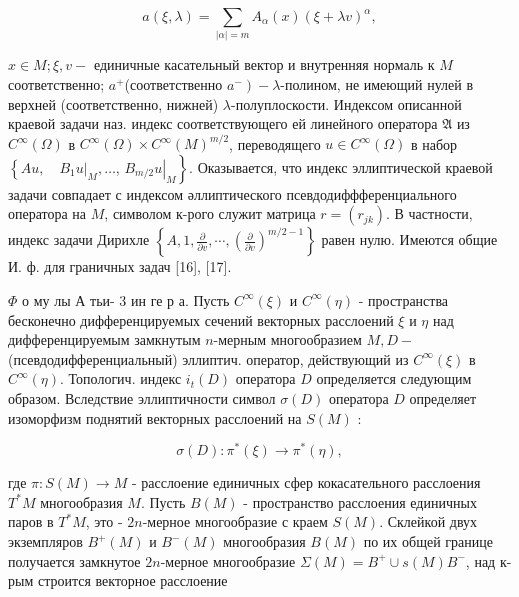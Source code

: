\documentclass[10pt]{article}
\begin{document}
\[

a(\xi, \lambda)=\sum_{|\alpha|=m} A_{\alpha}(x)(\xi+\lambda v)^{\alpha},

\]



$x \in M ; \xi, v-$ единичные касательный вектор и внутренняя нормаль к $M$ соответственно; $a^{+}$(соответственно $\left.a^{-}\right)-\lambda$-полином, не имеющий нулей в верхней (соответственно, нижней) $\lambda$-полуплоскости. Индексом описанной краевой задачи наз. индекс соответствующего ей линейного оператора $\mathfrak{A}$ из $C^{\infty}(\Omega)$ в $C^{\infty}(\Omega) \times C^{\infty}(M)^{m / 2}$, переводящего $u \in C^{\infty}(\Omega)$ в набор $\left\{A u,\left.\quad B_{1} u\right|_{M}, \ldots\right.$, $\left.\left.B_{m / 2} u\right|_{M}\right\}$. Оказывается, что индекс эллиптической краевой задачи совпадает с индексом әллиптического псевдодиффференциального оператора на $M$, символом к-рого служит матрица $r=\left(r_{j k}\right)$. В частности, индекс задачи Дирихле $\left\{A, 1, \frac{\partial}{\partial v}, \cdots,\left(\frac{\partial}{\partial v}\right)^{m / 2-1}\right\}$ равен нулю. Имеются общие И. ф. для граничных задач [16], [17].



$\Phi$ о му лы А тьи- 3 ин ге р а. Пусть $C^{\infty}(\xi)$ и $C^{\infty}(\eta)$ - пространства бесконечно дифференцируемых сечений векторных расслоений $\xi$ и $\eta$ над дифференцируемым замкнутым $n$-мерным многообразием $M, D-$ (псевдодифференциальный) эллиптич. оператор, действующий из $C^{\infty}(\xi)$ в $C^{\infty}(\eta)$. Топологич. индекс $i_{t}(D)$ оператора $D$ определяется следующим образом. Вследствие эллиптичности символ $\sigma(D)$ оператора $D$ определяет изоморфизм поднятий векторных расслоений на $S(M)$ :



\[

\sigma(D): \pi^{*}(\xi) \rightarrow \pi^{*}(\eta),

\]



где $\pi: S(M) \rightarrow M$ - расслоение единичных сфер кокасательного расслоения $T^{*} M$ многообразия $M$. Пусть $B(M)$ - пространство расслоения единичных паров в $T^{*} M$, это - $2 n$-мерное многообразие с краем $S(M)$. Склейкой двух экземпляров $B^{+}(M)$ и $B^{-}(M)$ многообразия $B(M)$ по их общей границе получается замкнутое $2 n$-мерное многообразие $\Sigma(M)=B^{+} \cup s(M) B^{-}$, над к-рым строится векторное расслоение
\end{document}
